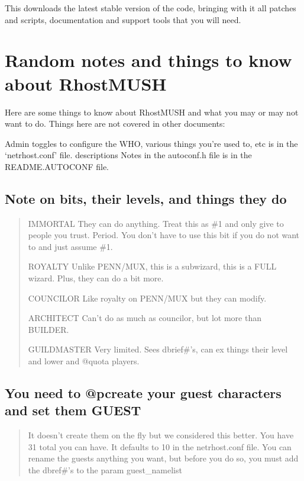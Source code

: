 \documentclass[letterpaper,10pt,english]{sphinxmanual}
\begin{document}
\sphinxAtStartPar
This downloads the latest stable version of the code, bringing with it all patches and scripts, documentation and support tools that you will need.


\chapter{Random notes and things to know about RhostMUSH}
\label{\detokenize{23-random:random-notes-and-things-to-know-about-rhostmush}}\label{\detokenize{23-random::doc}}
\sphinxAtStartPar
Here are some things to know about RhostMUSH and what you may or may not
want to do.  Things here are not covered in other documents:

\sphinxAtStartPar
Admin toggles to configure the WHO, various things you’re used to, etc is in the
‘netrhost.conf’ file.  descriptions Notes in the autoconf.h file is in the
README.AUTOCONF file.


\section{Note on bits, their levels, and things they do}
\label{\detokenize{23-random:note-on-bits-their-levels-and-things-they-do}}\begin{quote}

\sphinxAtStartPar
IMMORTAL \sphinxhyphen{} They can do anything.  Treat this as \#1 and only give to
people you trust.  Period.   You don’t have to use this bit
if you do not want to and just assume \#1.

\sphinxAtStartPar
ROYALTY \sphinxhyphen{} Unlike PENN/MUX, this is  a sub\sphinxhyphen{}wizard, this is a
FULL wizard.  Plus, they can do a bit more.

\sphinxAtStartPar
COUNCILOR \sphinxhyphen{} Like royalty on PENN/MUX but they can modify.

\sphinxAtStartPar
ARCHITECT \sphinxhyphen{} Can’t do as much as councilor, but lot more than BUILDER.

\sphinxAtStartPar
GUILDMASTER \sphinxhyphen{} Very limited.  Sees dbrief\#’s, can ex things their
level and lower and @quota players.
\end{quote}


\section{You need to @pcreate your guest characters and set them GUEST}
\label{\detokenize{23-random:you-need-to-pcreate-your-guest-characters-and-set-them-guest}}\begin{quote}

\sphinxAtStartPar
It doesn’t create them on the fly but we considered this better.
You have 31 total you can have.  It defaults to 10 in the
netrhost.conf file.  You can rename the guests anything you want,
but before you do so, you must add the dbref\#’s to the param
guest\_namelist
\end{quote}
\end{document}
